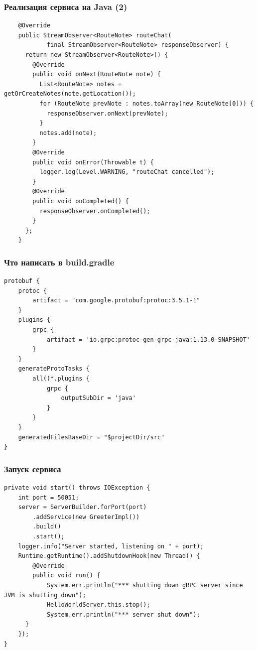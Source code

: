 \documentclass[xetex,mathserif,serif]{beamer}
\begin{document}
    \begin{frame}[fragile]
        \frametitle{Реализация сервиса на Java (2)}
        \begin{scriptsize}
            \begin{verbatim}
    @Override
    public StreamObserver<RouteNote> routeChat(
            final StreamObserver<RouteNote> responseObserver) {
      return new StreamObserver<RouteNote>() {
        @Override
        public void onNext(RouteNote note) {
          List<RouteNote> notes = getOrCreateNotes(note.getLocation());
          for (RouteNote prevNote : notes.toArray(new RouteNote[0])) {
            responseObserver.onNext(prevNote);
          }
          notes.add(note);
        }
        @Override
        public void onError(Throwable t) {
          logger.log(Level.WARNING, "routeChat cancelled");
        }
        @Override
        public void onCompleted() {
          responseObserver.onCompleted();
        }
      };
    }
            \end{verbatim}
        \end{scriptsize}
    \end{frame}

    \begin{frame}[fragile]
        \frametitle{Что написать в build.gradle}
        \begin{small}
            \begin{verbatim}
protobuf {
    protoc {
        artifact = "com.google.protobuf:protoc:3.5.1-1"
    }
    plugins {
        grpc {
            artifact = 'io.grpc:protoc-gen-grpc-java:1.13.0-SNAPSHOT'
        }
    }
    generateProtoTasks {
        all()*.plugins {
            grpc {
                outputSubDir = 'java'
            }
        }
    }
    generatedFilesBaseDir = "$projectDir/src"
}
            \end{verbatim}
        \end{small}
    \end{frame}

    \begin{frame}[fragile]
        \frametitle{Запуск сервиса}
        \begin{footnotesize}
            \begin{verbatim}
private void start() throws IOException {
    int port = 50051;
    server = ServerBuilder.forPort(port)
        .addService(new GreeterImpl())
        .build()
        .start();
    logger.info("Server started, listening on " + port);
    Runtime.getRuntime().addShutdownHook(new Thread() {
        @Override
        public void run() {
            System.err.println("*** shutting down gRPC server since JVM is shutting down");
            HelloWorldServer.this.stop();
            System.err.println("*** server shut down");
      }
    });
}
            \end{verbatim}
        \end{footnotesize}
    \end{frame}
\end{document}
